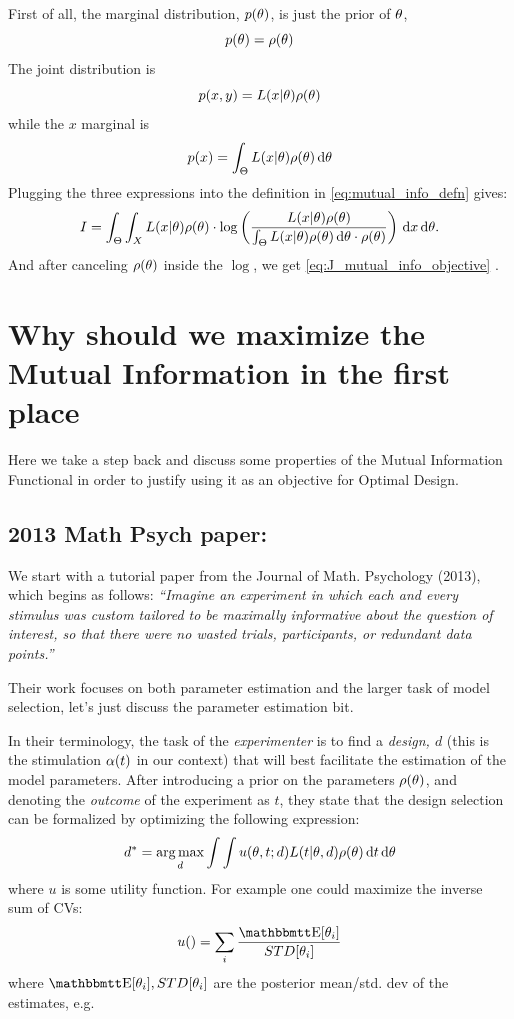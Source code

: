 \documentclass{article}
\begin{document}
First of all, the marginal distribution, $p({\theta})$,  is just the prior of ${\theta}$,
$$p({\theta}) = \rho({\theta})$$ The joint distribution is $$p(x,y) = L(x|{\theta})\rho({\theta})$$ while the $x$
marginal is $$p(x) = \int_\Theta L(x|{\theta})\rho({\theta}) \, \mathrm{d} {\theta}$$
Plugging the three expressions into the definition in
\cref{eq:mutual_info_defn} gives:
\begin{equation}
I = \int_\Theta \int_X L(x|{\theta})\rho({\theta}) \cdot 
\log \left( \frac{L(x|{\theta})\rho({\theta}) }{\int_\Theta L(x|{\theta})\rho({\theta}) \, \mathrm{d} {\theta}
\cdot \rho({\theta}) } \right)
\, \mathrm{d} x\, \mathrm{d} {\theta}.
\label{eq:mutual_info_prior_trajectory}
\end{equation}
And after canceling $\rho({\theta})$ inside the $\log$, we get
\cref{eq:J_mutual_info_objective} .


\section{Why should we maximize the Mutual Information in the first place}
Here we take a step back and discuss some properties of the Mutual Information
Functional in order to justify using it as an objective for Optimal Design.

\subsection{2013 Math Psych paper: \cite{Myung2013}}
We start with a tutorial paper from the Journal of Math. Psychology (2013),
which begins as follows: { \sl ``Imagine an experiment in which each and every
stimulus was custom tailored to be maximally informative about the question of
interest, so that there were no wasted trials, participants, or redundant data
points.''} 

Their work focuses on both parameter estimation and the larger task of model
selection, let's just discuss the parameter estimation bit. 

In their terminology, the task of the {\sl experimenter}
 is to find a { \sl design, $d$ } (this is the stimulation ${\alpha}(t)$ in our
 context) that will best facilitate the estimation of the model parameters.
 After introducing a prior on the parameters $\rho({\theta})$, and denoting the
 {\sl outcome} of the experiment as $t$, they state that the design selection
 can be formalized by optimizing the following expression: $$
d^* =  \argmax_d \int \int u(\th, t; d) L(t| \th, d) \rho (\th) \intd{t}
\intd{\th}
$$
where $u$ is some utility function. For example one could maximize the inverse
sum of CVs:
$$
u() = \sum_i \frac{\Exp[\th_i]}{STD[\th_i]}
$$
where 
$\Exp[\th_i], STD[\th_i]$ are the posterior mean/std. dev of the estimates, e.g.
\end{document}
